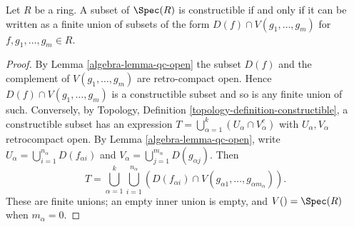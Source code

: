 \begin{lemma}
\label{editorial-source-lemma-constructible}
Let $R$ be a ring. A subset of $\Spec(R)$ is constructible if and only
if it can be written as a finite union of subsets of the form
$D(f) \cap V(g_1, \ldots, g_m)$ for $f, g_1, \ldots, g_m \in R$.
\end{lemma}

\begin{proof}
By Lemma \ref{algebra-lemma-qc-open} the subset $D(f)$ and the complement of
$V(g_1, \ldots, g_m)$ are retro-compact open. Hence
$D(f) \cap V(g_1, \ldots, g_m)$ is a constructible subset and so is
any finite union of such. Conversely, by Topology, Definition
\ref{topology-definition-constructible}, a constructible subset has an
expression $T=\bigcup_{\alpha=1}^k(U_\alpha\cap V_\alpha^c)$ with
$U_\alpha,V_\alpha$ retrocompact open. By Lemma \ref{algebra-lemma-qc-open}, write
$U_\alpha=\bigcup_{i=1}^{n_\alpha}D(f_{\alpha i})$ and
$V_\alpha=\bigcup_{j=1}^{m_\alpha}D(g_{\alpha j})$. Then
$$
T=\bigcup_{\alpha=1}^k\bigcup_{i=1}^{n_\alpha}
\left(D(f_{\alpha i})\cap
V(g_{\alpha1},\ldots,g_{\alpha m_\alpha})\right).
$$
These are finite unions; an empty inner union is empty, and
$V()=\Spec(R)$ when $m_\alpha=0$.
\end{proof}